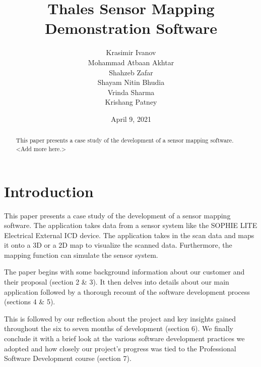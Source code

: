 \documentclass{l3proj}
\begin{document}
\title{Thales Sensor Mapping Demonstration Software}

    \author{Krasimir Ivanov\\
        Mohammad Atbaan Akhtar \\
        Shahzeb Zafar \\
        Shayam Nitin Bhudia \\
        Vrinda Sharma\\ 
        Krishang Patney\\}

\date{April 9, 2021}

\maketitle

\begin{abstract}

This paper presents a case study of the development of a sensor mapping software.   
<Add more here.>

\end{abstract}

\educationalconsent

\newpage

\section{Introduction}

This paper presents a case study of the development of a sensor mapping software. The application takes data from a sensor system like the SOPHIE LITE Electrical External ICD device. The application takes in the scan data and maps it onto a 3D or a 2D map to visualize the scanned data. Furthermore, the mapping function can simulate the sensor system.

The paper begins with some background information about our customer and their proposal (section 2 \& 3). It then delves into details about our main application followed by a thorough recount of the software development process (sections 4 \& 5). 

This is followed by our reflection about the project and key insights gained throughout the six to seven months of development (section 6). We finally conclude it with a brief look at the various software development practices we adopted and how closely our project’s progress was tied to the Professional Software Development course (section 7).
\end{document}

